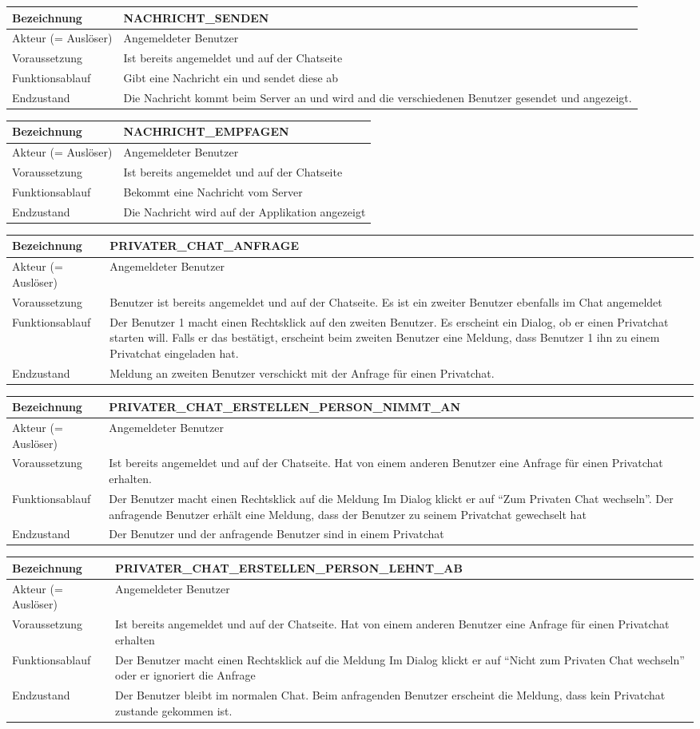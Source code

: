 \documentclass[12pt]{article}
\newcommand{\requirementTable}[5]{
    \begin{table}[H]
      \begin{tabularx}{\textwidth}{|l|X|}
        \hline
        Bezeichnung & #1  \\ \hline
        Akteur (= Auslöser) & #2  \\ \hline
        Voraussetzung & #3  \\ \hline
        Funktionsablauf & #4  \\ \hline
        Endzustand & #5  \\ \hline
      \end{tabularx}
    \end{table}
}
\begin{document}
        \requirementTable
            {NACHRICHT\_SENDEN}
            {Angemeldeter Benutzer}
            {Ist bereits angemeldet und auf der Chatseite}
            {Gibt eine Nachricht ein und sendet diese ab}
            {Die Nachricht kommt beim Server an und wird and die verschiedenen Benutzer gesendet und angezeigt.}

        \requirementTable
            {NACHRICHT\_EMPFAGEN}
            {Angemeldeter Benutzer}
            {Ist bereits angemeldet und auf der Chatseite}
            {Bekommt eine Nachricht vom Server}
            {Die Nachricht wird auf der Applikation angezeigt}


        \requirementTable
            {PRIVATER\_CHAT\_ANFRAGE}
            {Angemeldeter Benutzer}
            {
            Benutzer ist bereits angemeldet und auf der Chatseite. \newline
            Es ist ein zweiter Benutzer ebenfalls im Chat angemeldet
            }
            {
            Der Benutzer 1 macht einen Rechtsklick auf den zweiten Benutzer. \newline
            Es erscheint ein Dialog, ob er einen Privatchat starten will. \newline
            Falls er das bestätigt, erscheint beim zweiten Benutzer eine Meldung, dass Benutzer 1 ihn zu einem Privatchat eingeladen hat.
            }
            {Meldung an zweiten Benutzer verschickt mit der Anfrage für einen Privatchat.}


        \requirementTable
            {PRIVATER\_CHAT\_ERSTELLEN\_PERSON\_\newline NIMMT\_AN }
            {Angemeldeter Benutzer}
            {
            Ist bereits angemeldet und auf der Chatseite. \newline
            Hat von einem anderen Benutzer eine Anfrage für einen Privatchat erhalten.}
            {
            Der Benutzer macht einen Rechtsklick auf die Meldung Im Dialog klickt er auf “Zum Privaten Chat wechseln”. \newline
            Der anfragende Benutzer erhält eine Meldung, dass der Benutzer zu seinem Privatchat gewechselt hat
            }
            {Der Benutzer und der anfragende Benutzer sind in einem Privatchat}


        \requirementTable
            {PRIVATER\_CHAT\_ERSTELLEN\_PERSON\_\newline LEHNT\_AB}
            {Angemeldeter Benutzer}
            {
            Ist bereits angemeldet und auf der Chatseite. \newline
            Hat von einem anderen Benutzer eine Anfrage für einen Privatchat erhalten
            }
            {
            Der Benutzer macht einen Rechtsklick auf die Meldung Im Dialog klickt er auf “Nicht zum Privaten Chat wechseln”\newline
            oder er ignoriert die Anfrage
            }
            {
            Der Benutzer bleibt im normalen Chat. \newline
            Beim anfragenden Benutzer erscheint die Meldung, dass kein Privatchat zustande gekommen ist.
            }
\end{document}
